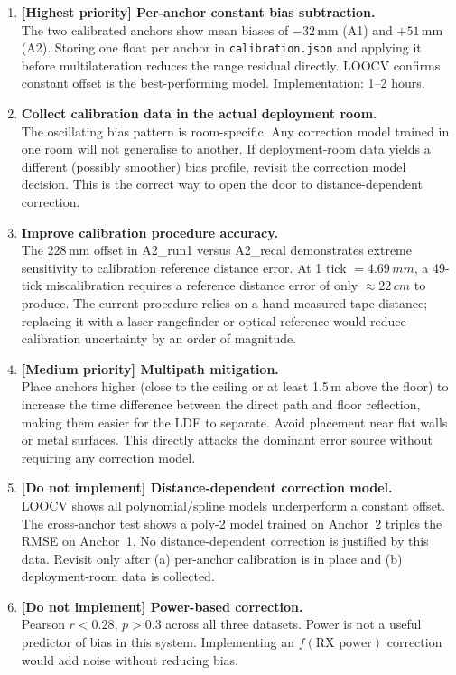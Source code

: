 \documentclass[10pt,a4paper,twocolumn]{article}
\begin{document}
\begin{enumerate}

\item \textbf{[Highest priority] Per-anchor constant bias subtraction.}\\
  The two calibrated anchors show mean biases of $-32$\,mm (A1) and
  $+51$\,mm (A2).  Storing one float per anchor in \texttt{calibration.json}
  and applying it before multilateration reduces the range residual directly.
  LOOCV confirms constant offset is the best-performing model.
  Implementation: 1--2 hours.

\item \textbf{Collect calibration data in the actual deployment room.}\\
  The oscillating bias pattern is room-specific.  Any correction model trained
  in one room will not generalise to another.  If deployment-room data yields a
  different (possibly smoother) bias profile, revisit the correction model
  decision.  This is the correct way to open the door to distance-dependent
  correction.

\item \textbf{Improve calibration procedure accuracy.}\\
  The 228\,mm offset in A2\_run1 versus A2\_recal demonstrates
  extreme sensitivity to calibration reference distance error.  At 1 tick $=
  4.69\,mm$, a 49-tick miscalibration requires a reference distance error
  of only $\approx 22\,cm$ to produce.  The current procedure relies on
  a hand-measured tape distance; replacing it with a laser rangefinder or
  optical reference would reduce calibration uncertainty by an order of
  magnitude.

\item \textbf{[Medium priority] Multipath mitigation.}\\
  Place anchors higher (close to the ceiling or at least 1.5\,m above
  the floor) to increase the time difference between the direct path and floor
  reflection, making them easier for the LDE to separate.  Avoid placement
  near flat walls or metal surfaces.  This directly attacks the dominant error
  source without requiring any correction model.

\item \textbf{[Do not implement] Distance-dependent correction model.}\\
  LOOCV shows all polynomial/spline models underperform a constant offset.
  The cross-anchor test shows a poly-2 model trained on Anchor~2 triples the
  RMSE on Anchor~1.  No distance-dependent correction is justified by this
  data.  Revisit only after (a) per-anchor calibration is in place and (b)
  deployment-room data is collected.

\item \textbf{[Do not implement] Power-based correction.}\\
  Pearson $r < 0.28$, $p > 0.3$ across all three datasets.  Power is
  not a useful predictor of bias in this system.  Implementing an
  $f(\text{RX power})$ correction would add noise without reducing bias.

\end{enumerate}
\end{document}
